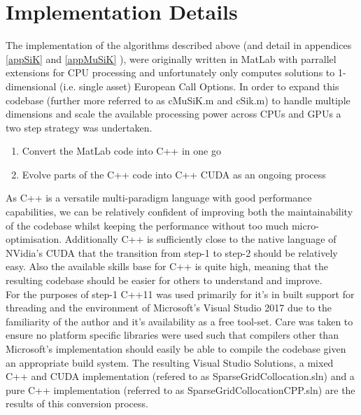 \documentclass[a4paper]{amsart}
\begin{document}
\section{Implementation Details}
The implementation of the algorithms described above (and detail in appendices \ref{appSiK} and \ref{appMuSiK} ), were originally written in MatLab with parrallel extensions for CPU processing and unfortunately only computes solutions to 1-dimensional (i.e. single asset) European Call Options. In order to expand this codebase (further more referred to as cMuSiK.m and cSik.m) to handle multiple dimensions and scale the available processing power across CPUs and GPUs a two step strategy was undertaken.\\

\renewcommand{\labelenumi}{\arabic{enumi}}
\begin{enumerate}
\item Convert the MatLab code into C++ in one go
\item Evolve parts of the C++ code into C++ CUDA as an ongoing process
\end{enumerate}

As C++ is a versatile multi-paradigm language with good performance capabilities, we can be relatively confident of improving both the maintainability of the codebase whilst keeping the performance without too much micro-optimisation. Additionally C++ is sufficiently close to the native language of NVidia's CUDA that the transition from step-1 to step-2 should be relatively easy. Also the available skills base for C++ is quite high, meaning that the resulting codebase should be easier for others to understand and improve.\\

For the purposes of step-1 C++11 was used primarily for it's in built support for threading and the environment of Microsoft's Visual Studio 2017 due to the familiarity of the author and it's availability as a free tool-set. Care was taken to ensure no platform specific libraries were used such that compilers other than Microsoft's implementation should easily be able to compile the codebase given an appropriate build system. The resulting Visual Studio Solutions, a mixed C++ and CUDA implementation (refered to as SparseGridCollocation.sln) and a pure C++ implementation (referred to as SparseGridCollocationCPP.sln) are the results of this conversion process.\\
\end{document}

